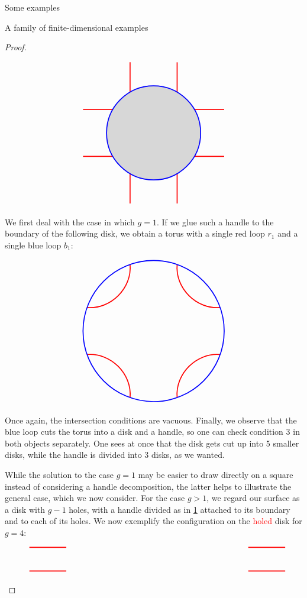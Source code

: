 \begin{chapter}{Some examples}
\begin{section}{A family of finite-dimensional examples}
\begin{proof}
\begin{figure}[h]
\[\begin{tikzpicture}
\fill [black,opacity=.15] circle (2cm);

\draw[red, very thick] (-3,1) -- (-1.73,1);
\draw[red, very thick] (-3,-1) -- (-1.73,-1);

\draw[red, very thick] (3,1) -- (1.73,1);
\draw[red, very thick] (3,-1) -- (1.73,-1);

\draw[red, very thick] (1,-3) -- (1,-1.73);
\draw[red, very thick] (-1,-3) -- (-1,-1.73);

\draw[red, very thick] (1,3) -- (1,1.73);
\draw[red, very thick] (-1,3) -- (-1,1.73);

\draw[blue, very thick] (0,0) circle (2cm);
\end{tikzpicture}
\]
\end{figure}

We first deal with the case in which $g=1$. If we glue such a handle to the boundary of the following disk, we obtain a torus with a single red loop $r_1$ and a single blue loop $b_1$:

\begin{figure}[h]
\label{divided-handle}
\[
\begin{tikzpicture}

\draw[red, very thick] (-2.83,1) to [bend right=50] (-1,2.83);
\draw[red, very thick] (2.83,1) to [bend left=50] (1,2.83);
\draw[red, very thick] (2.83,-1) to [bend right=50] (1,-2.83);
\draw[red, very thick] (-2.83,-1) to [bend left=50] (-1,-2.83);

\draw[blue, very thick] (0,0) circle (3cm);
\end{tikzpicture}
\]
\end{figure}

Once again, the intersection conditions are vacuous. Finally, we observe that the blue loop cuts the torus into a disk and a handle, so one can check condition $3$ in both objects separately. One sees at once that the disk gets cut up into 5 smaller disks, while the handle is divided into $3$ disks, as we wanted.

While the solution to the case $g=1$ may be easier to draw directly on a square instead of considering a handle decomposition, the latter helps to illustrate the general case, which we now consider. For the case $g>1$, we regard our surface as a disk with $g-1$ holes, with a handle divided as in \ref{divided-handle} attached to its boundary and to each of its holes. We now exemplify the configuration on the \textcolor{red}{holed} disk for $g=4$:

\begin{figure}[h]
\[
\begin{tikzpicture}
\draw[red, very thick] (-5.44, 0.5) -- (-3.87, 0.5);
\draw[red, very thick] (-5.44, -0.5) -- (-3.87, -0.5);
\draw[red, very thick] (5.44, 0.5) -- (3.87, 0.5);
\draw[red, very thick] (5.44, -0.5) -- (3.87, -0.5);


\end{tikzpicture}\]
\end{figure}
\end{proof}
\end{section}
\end{chapter}
